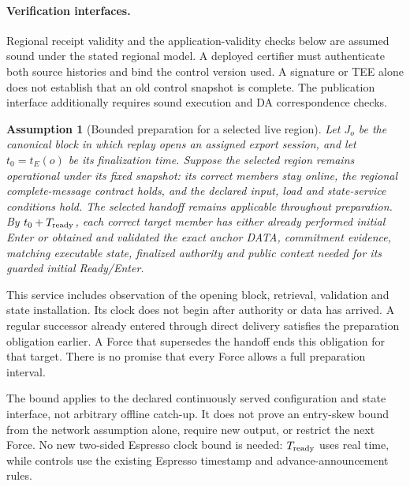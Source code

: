\documentclass[11pt,a4paper]{article}
\newtheorem{assumption}[assumption]{Assumption}
\begin{document}
\paragraph{Verification interfaces.}
Regional receipt validity and the application-validity checks below
are assumed sound under the stated regional model. A deployed
certifier must authenticate both source histories and bind the control
version used. A signature or TEE alone does not establish that an old
control snapshot is complete. The publication interface additionally
requires sound execution and DA correspondence checks.

\begin{assumption}[Bounded preparation for a selected live region]
\label{ass:ready-service}
Let $J_o$ be the canonical block in which replay opens an assigned
export session, and let $t_0=t_E(o)$ be its finalization time.
Suppose the selected region remains operational under its fixed
snapshot: its correct members stay online, the regional complete-message
contract holds, and the declared input, load and state-service conditions
hold. The selected handoff remains applicable throughout preparation.
By $t_0+T_{\rm ready}$, each correct target member has either already
performed initial Enter or obtained and validated the exact anchor DATA,
commitment evidence, matching executable state, finalized authority and
public context needed for its guarded initial Ready/Enter.
\end{assumption}
This service includes observation of the opening block, retrieval,
validation and state installation. Its clock does not begin after
authority or data has arrived. A regular successor already entered
through direct delivery satisfies the preparation obligation earlier.
A Force that supersedes the handoff ends this obligation for that target.
There is no promise that every Force allows a full preparation interval.

The bound applies to the declared continuously served configuration and
state interface, not arbitrary offline catch-up. It does not prove an
entry-skew bound from the network assumption alone, require new output,
or restrict the next Force. No new two-sided Espresso clock bound is
needed: $T_{\rm ready}$ uses real time, while controls use the existing
Espresso timestamp and advance-announcement rules.
\end{document}
